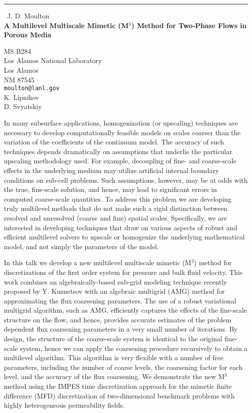 \documentclass{report}
\begin{document}
\begin{center}
\rule{6in}{1pt} \
{\large J. D. Moulton \\
{\bf A Multilevel Multiscale Mimetic (M$^3$) Method for Two-Phase Flows in Porous Media }}

MS B284 \\ Los Alamos National Laboratory \\ Los Alamos \\ NM 87545
\\
{\tt moulton@lanl.gov}\\
K. Lipnikov\\
D. Svyatskiy\end{center}

In many subsurface applications, homogenization (or upscaling)
techniques are necessary to develop computationally feasible models on
scales coarser than the variation of the coefficients of the continuum
model. The accuracy of such techniques depends dramatically on
assumptions that underlie the particular upscaling methodology used. For
example, decoupling of fine- and coarse-scale effects in the underlying
medium may utilize artificial internal boundary conditions on sub-cell
problems. Such assumptions, however, may be at odds with the true,
fine-scale solution, and hence, may lead to significant errors in
computed coarse-scale quantities. To address this problem we are
developing truly multilevel methods that do not make such a rigid
distinction between resolved and unresolved (coarse and fine) spatial
scales. Specifically, we are interested in developing techniques that
draw on various aspects of robust and efficient multilevel solvers to
upscale or homogenize the underlying mathematical model, and not simply
the parameters of the model.

In this talk we develop a new multilevel multiscale mimetic
(M$^{3}$) method for discretizations of the first order system for
pressure and bulk fluid velocity. This work combines an
algebraically-based sub-grid modeling technique recently proposed by Y.
Kuznetsov with an algebraic multigrid (AMG) method for
approximating the flux coarsening parameters. The use of a robust
variational multigrid algorithm, such as AMG, efficiently captures the
effects of the fine-scale structure on the flow, and hence, provides
accurate estimates of the problem dependent flux coarsening parameters in
a very small number of iterations. By design, the structure of the
coarse-scale system is identical to the original fine-scale system, hence
we can apply the coarsening procedure recursively to obtain a multilevel
algorithm. This algorithm is very flexible with a number of free
parameters, including the number of coarse levels, the coarsening factor
for each level, and the accuracy of the flux coarsening. We demonstrate
the new M$^{3}$ method using the IMPES time discretization approach for
the mimetic finite difference
(MFD) discretization of two-dimensional benchmark problems
with highly heterogeneous permeability fields.
\end{document}
